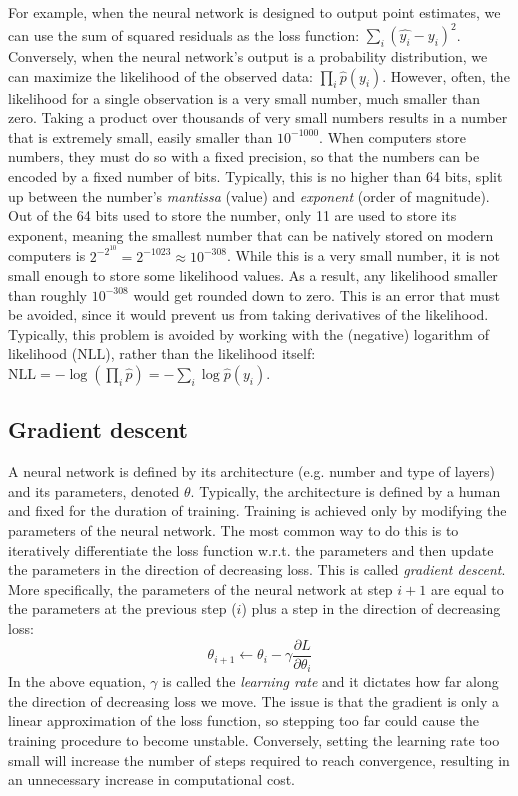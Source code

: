 \documentclass[12pt]{article}
\begin{document}
For example, when the neural network is designed to output point estimates, we can use the sum of squared residuals as the loss function: $\sum_i (\hat{y_i} - y_i)^2$. Conversely, when the neural network's output is a probability distribution, we can maximize the likelihood of the observed data: $\prod_i \hat{p}(y_i)$. However, often, the likelihood for a single observation is a very small number, much smaller than zero. Taking a product over thousands of very small numbers results in a number that is extremely small, easily smaller than $10^{-1000}$. When computers store numbers, they must do so with a fixed precision, so that the numbers can be encoded by a fixed number of bits. Typically, this is no higher than 64 bits, split up between the number's \textit{mantissa} (value) and \textit{exponent} (order of magnitude). Out of the 64 bits used to store the number, only 11 are used to store its exponent, meaning the smallest number that can be natively stored on modern computers is $2^{-2^{10}} = 2^{-1023} \approx 10^{-308}$. While this is a very small number, it is not small enough to store some likelihood values. As a result, any likelihood smaller than roughly $10^{-308}$ would get rounded down to zero. This is an error that must be avoided, since it would prevent us from taking derivatives of the likelihood. Typically, this problem is avoided by working with the (negative) logarithm of likelihood ($\textrm{NLL}$), rather than the likelihood itself: $\textrm{NLL} = -\log(\prod_i \hat{p}) = -\sum_i \log\hat{p}(y_i)$.

\subsection{Gradient descent}

A neural network is defined by its architecture (e.g. number and type of layers) and its parameters, denoted $\theta$. Typically, the architecture is defined by a human and fixed for the duration of training. Training is achieved only by modifying the parameters of the neural network. The most common way to do this is to iteratively differentiate the loss function w.r.t. the parameters and then update the parameters in the direction of decreasing loss. This is called \textit{gradient descent}. More specifically, the parameters of the neural network at step $i+1$ are equal to the parameters at the previous step ($i$) plus a step in the direction of decreasing loss:
\begin{equation}
\theta_{i+1} \leftarrow \theta_{i} - \gamma \frac{\partial L}{\partial \theta_i}
\label{eq_sgd}
\end{equation}
In the above equation, $\gamma$ is called the \textit{learning rate} and it dictates how far along the direction of decreasing loss we move. The issue is that the gradient is only a linear approximation of the loss function, so stepping too far could cause the training procedure to become unstable. Conversely, setting the learning rate too small will increase the number of steps required to reach convergence, resulting in an unnecessary increase in computational cost.
\end{document}
